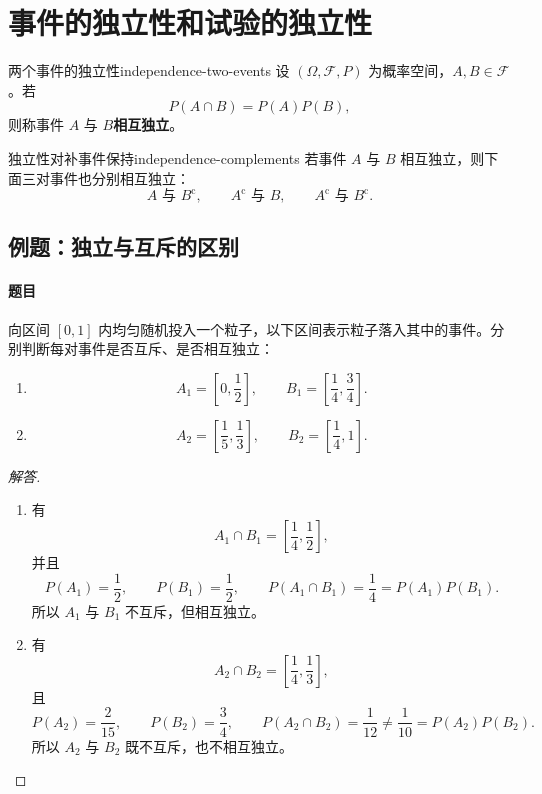 \clearpage\section{事件的独立性和试验的独立性}\label{k:independence}

\begin{mydefinition}{两个事件的独立性}{independence-two-events}
设 $(\Omega,\mathscr{F},P)$ 为概率空间，$A,B\in\mathscr{F}$。若
\[
P(A\cap B)=P(A)P(B),
\]
则称事件 $A$ 与 $B$\textbf{相互独立}。
\end{mydefinition}

\begin{proposition}{独立性对补事件保持}{independence-complements}
若事件 $A$ 与 $B$ 相互独立，则下面三对事件也分别相互独立：
\[
A\text{ 与 }B^{\mathrm c},
\qquad
A^{\mathrm c}\text{ 与 }B,
\qquad
A^{\mathrm c}\text{ 与 }B^{\mathrm c}.
\]
\end{proposition}

\subsection{例题：独立与互斥的区别}\label{note:c1:e24}
\paragraph{题目}
向区间 $[0,1]$ 内均匀随机投入一个粒子，以下区间表示粒子落入其中的事件。分别判断每对事件是否互斥、是否相互独立：
\begin{enumerate}
\item \[
A_1=\left[0,\frac12\right],
\qquad
B_1=\left[\frac14,\frac34\right].
\]
\item \[
A_2=\left[\frac15,\frac13\right],
\qquad
B_2=\left[\frac14,1\right].
\]
\end{enumerate}

\begin{proof}[解答]
\begin{enumerate}
\item 有
\[
A_1\cap B_1=\left[\frac14,\frac12\right],
\]
并且
\[
P(A_1)=\frac12,
\qquad
P(B_1)=\frac12,
\qquad
P(A_1\cap B_1)=\frac14=P(A_1)P(B_1).
\]
所以 $A_1$ 与 $B_1$ 不互斥，但相互独立。
\item 有
\[
A_2\cap B_2=\left[\frac14,\frac13\right],
\]
且
\[
P(A_2)=\frac{2}{15},
\qquad
P(B_2)=\frac34,
\qquad
P(A_2\cap B_2)=\frac1{12}\ne\frac1{10}=P(A_2)P(B_2).
\]
所以 $A_2$ 与 $B_2$ 既不互斥，也不相互独立。
\end{enumerate}
\end{proof}

